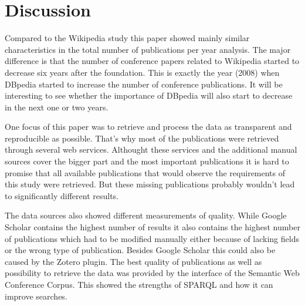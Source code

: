 \documentclass[english]{lni}
\begin{document}
\newpage
\section{Discussion}
\label{sec-4}


  Compared to the Wikipedia study this paper showed mainly similar
  characteristics in the total number of publications per year analysis. The
  major difference is that the number of conference papers related to Wikipedia
  started to decrease six years after the foundation. This is exactly the year
  (2008) when DBpedia started to increase the number of conference
  publications. It will be interesting to see whether the importance of DBpedia
  will also start to decrease in the next one or two years.

  One focus of this paper was to retrieve and process the data as transparent
  and reproducible as possible. That's why most of the publications were
  retrieved through several web services. Althought these services and the
  additional manual sources cover the bigger part and the most important
  publications it is hard to promise that all available publications that would
  observe the requirements of this study were retrieved. But these missing
  publications probably wouldn't lead to significantly different results.

  The data sources also showed different measurements of quality. While Google
  Scholar contains the highest number of results it also contains the highest
  number of publications which had to be modified manually either because of lacking
  fields or the wrong type of publication. Besides Google Scholar this could
  also be caused by the Zotero plugin. The best quality of publications as well
  as possibility to retrieve the data was provided by the interface of the Semantic
  Web Conference Corpus. This showed the strengths of SPARQL and how it can improve searches.



\end{document}
